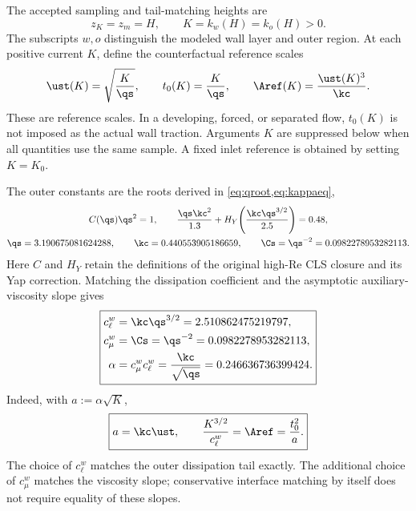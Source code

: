 The accepted sampling and tail-matching heights are
\begin{equation}
 \boxed{z_K=z_m=H,\qquad
 K=k_w(H)=k_o(H)>0.}
 \label{eq:accepted-sampling}
\end{equation}
The subscripts $w,o$ distinguish the modeled wall layer and outer
region. At each positive current $K$, define the counterfactual
reference scales
\begin{equation}
 \ust(K)=\sqrt{\frac{K}{\qs}},\qquad
 t_0(K)=\frac{K}{\qs},\qquad
 \Aref(K)=\frac{\ust(K)^3}{\kc}.
 \label{eq:accepted-reference-scales}
\end{equation}
These are reference scales. In a developing, forced, or separated
flow, $t_0(K)$ is not imposed as the actual wall traction.
Arguments $K$ are suppressed below when all quantities use the same
sample. A fixed inlet reference is obtained by setting $K=K_0$.

The outer constants are the roots derived in
\cref{eq:qroot,eq:kappaeq},
\begin{equation}
 \begin{gathered}
 C(\qs)\qs^2=1,\qquad
 \frac{\qs\kc^2}{1.3}
 +H_Y\!\left(\frac{\kc\qs^{3/2}}{2.5}\right)=0.48,\\
 \qs=3.190675081624288,\qquad
 \kc=0.440553905186659,\qquad
 \Cs=\qs^{-2}=0.0982278953282113.
 \end{gathered}
 \label{eq:accepted-cls-constants}
\end{equation}
Here $C$ and $H_Y$ retain the definitions of the original high-Re CLS
closure and its Yap correction. Matching the dissipation coefficient
and the asymptotic auxiliary-viscosity slope gives
\begin{equation}
 \boxed{\begin{aligned}
 c_\ell^w&=\kc\qs^{3/2}=2.510862475219797,\\
 c_\mu^w&=\Cs=\qs^{-2}=0.0982278953282113,\\
 \alpha&=c_\mu^wc_\ell^w
       =\frac{\kc}{\sqrt{\qs}}=0.246636736399424.
 \end{aligned}}
 \label{eq:accepted-coefficients}
\end{equation}
Indeed, with $a:=\alpha\sqrt K$,
\begin{equation}
 \boxed{a=\kc\ust,\qquad
 \frac{K^{3/2}}{c_\ell^w}=\Aref
 =\frac{t_0^2}{a}.}
 \label{eq:accepted-calibration-identities}
\end{equation}
The choice of $c_\ell^w$ matches the outer dissipation tail exactly.
The additional choice of $c_\mu^w$ matches the viscosity slope;
conservative interface matching by itself does not require equality
of these slopes.


